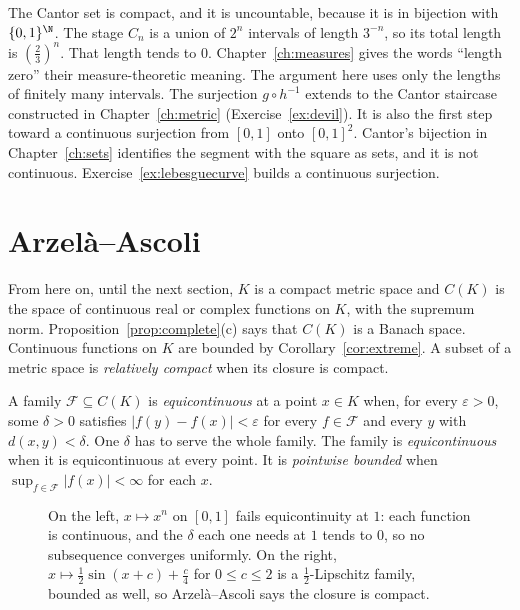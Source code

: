 The Cantor set is compact, and it is uncountable, because it is in bijection with $\{0,1\}^\N$. The stage $C_n$ is a union of $2^n$ intervals of length $3^{-n}$, so its total length is $(\frac23)^n$. That length tends to $0$. Chapter~\ref{ch:measures} gives the words ``length zero'' their measure-theoretic meaning. The argument here uses only the lengths of finitely many intervals. The surjection $g\circ h^{-1}$ extends to the Cantor staircase constructed in Chapter~\ref{ch:metric} (Exercise~\ref{ex:devil}). It is also the first step toward a continuous surjection from $[0,1]$ onto $[0,1]^2$. Cantor's bijection in Chapter~\ref{ch:sets} identifies the segment with the square as sets, and it is not continuous. Exercise~\ref{ex:lebesguecurve} builds a continuous surjection.

\section{Arzel\`a--Ascoli}\label{sec:ascoli}

From here on, until the next section, $K$ is a compact metric space and $C(K)$ is the space of continuous real or complex functions on $K$, with the supremum norm. Proposition~\ref{prop:complete}(c) says that $C(K)$ is a Banach space. Continuous functions on $K$ are bounded by Corollary~\ref{cor:extreme}. A subset of a metric space is \emph{relatively compact} when its closure is compact.

\begin{definition}
A family $\mathcal F\subseteq C(K)$ is \emph{equicontinuous} at a point $x\in K$ when, for every $\varepsilon>0$, some $\delta>0$ satisfies $|f(y)-f(x)|<\varepsilon$ for every $f\in\mathcal F$ and every $y$ with $d(x,y)<\delta$. One $\delta$ has to serve the whole family. The family is \emph{equicontinuous} when it is equicontinuous at every point. It is \emph{pointwise bounded} when $\sup_{f\in\mathcal F}|f(x)|<\infty$ for each $x$.
\end{definition}

\begin{figure}[ht]
\centering
{}
\caption{On the left, $x\mapsto x^n$ on $[0,1]$ fails equicontinuity at $1$: each function is continuous, and the $\delta$ each one needs at $1$ tends to $0$, so no subsequence converges uniformly. On the right, $x\mapsto\frac12\sin(x+c)+\frac c4$ for $0\le c\le 2$ is a $\frac12$-Lipschitz family, bounded as well, so Arzel\`a--Ascoli says the closure is compact.}
\label{fig:equicont}
\end{figure}

